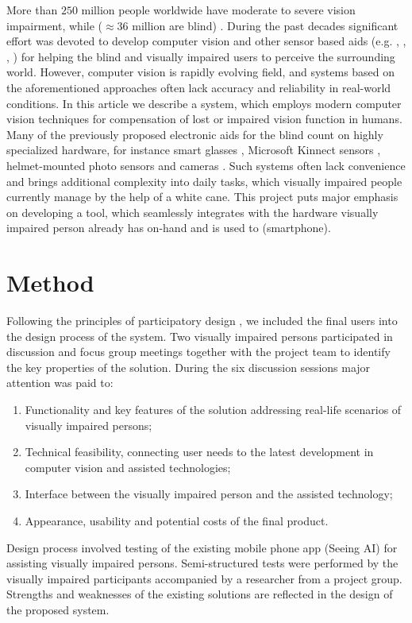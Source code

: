 \documentclass[10pt,conference,compsocconf]{IEEEtran}
\begin{document}
More than $250$ million people worldwide have moderate to severe vision impairment, while ($\approx 36$ million are blind) \cite{Bourne}. During the past decades significant effort was devoted to develop computer vision and other sensor based aids (e.g. \cite{Caraiman}, \cite{Csapo}, \cite{Poggi}, \cite{Zientara}) for helping the blind and visually impaired users to perceive the surrounding world. However, computer vision is rapidly evolving field, and systems based on the aforementioned approaches often lack accuracy and reliability in real-world conditions. In this article we describe a system, which employs modern computer vision techniques for compensation of lost or impaired vision function in humans. Many of the previously proposed electronic aids for the blind count on highly specialized hardware, for instance smart glasses \cite{Zientara}, Microsoft Kinnect sensors \cite{Owayjan}, helmet-mounted photo sensors and cameras \cite{Larisa}. Such systems often lack convenience and brings additional complexity into daily tasks, which visually impaired people currently manage by the help of a white cane. This project puts major emphasis on developing a tool, which seamlessly integrates with the hardware visually impaired person already has on-hand and is used to (smartphone). %


\section{Method}
\label{sec:method}

Following the principles of participatory design \cite{Kensing}, \cite{Carroll} we included the final users into the design process of the system. Two visually impaired persons participated in discussion and focus group meetings together with the project team to identify the key properties of the solution. During the six discussion sessions major attention was paid to:
\begin{enumerate}
\item Functionality and key features of the solution addressing real-life scenarios of visually impaired persons;
\item Technical feasibility, connecting user needs to the latest development in computer vision and assisted technologies;
\item Interface between the visually impaired person and the assisted technology;
\item Appearance, usability and potential costs of the final product. 
\end{enumerate}
Design process involved testing of the existing mobile phone app (Seeing AI) for assisting visually impaired persons. Semi-structured tests were performed by the visually impaired participants accompanied by a researcher from a project group. Strengths and weaknesses of the existing solutions are reflected in the design of the proposed system. 
\end{document}
